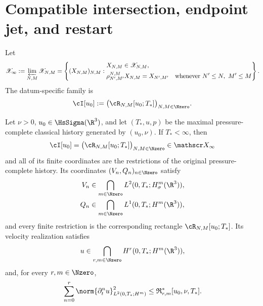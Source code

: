 \section{Compatible intersection, endpoint jet, and restart}

\begin{definition}
\label{def:compatible-intersection}
Let
\begin{equation}
 \mathscr X_\infty
 :=\varprojlim_{N,M}\mathscr X_{N,M}
 =\left\{(X_{N,M})_{N,M}:
 \begin{aligned}
 &X_{N,M}\in\mathscr X_{N,M},\\
 &\rho_{N',M'}^{N,M}X_{N,M}=X_{N',M'}
 \quad\text{whenever }N'\le N,\ M'\le M
 \end{aligned}
 \right\}.
 \label{eq:compatible-intersection-space}
\end{equation}
The datum-specific family is
\begin{equation}
 \cI[u_0]
 :=\bigl(\cR_{N,M}[u_0;T_*]\bigr)_{N,M\in\Nzero}.
 \label{eq:compatible-intersection}
\end{equation}
\end{definition}

\begin{theorem}
\label{thm:compatible-inverse-intersection}
Let \(\nu>0\), \(u_0\in\HsSigma(\R^3)\), and let
\((T_*,u,p)\) be the maximal pressure-complete classical history generated
by \((u_0,\nu)\).  If \(T_*<\infty\), then
\begin{equation}
 \cI[u_0]
 =\bigl(\cR_{N,M}[u_0;T_*]\bigr)_{N,M\in\Nzero}
 \in\mathscr X_\infty
 \label{eq:ier-compatible-family}
\end{equation}
and all of its finite coordinates are the restrictions of the original pressure-complete history.  Its coordinates \((V_n,Q_n)_{n\in\Nzero}\)
satisfy
\begin{align}
 V_n&\in\bigcap_{m\in\Nzero}L^2(0,T_*;H^m_\sigma(\R^3)),
 \label{eq:ier-inverse-velocity-coordinate}\\
 Q_n&\in\bigcap_{m\in\Nzero}L^1(0,T_*;H^m(\R^3)),
 \label{eq:ier-inverse-pressure-coordinate}
\end{align}
and every finite restriction is the corresponding rectangle
\(\cR_{N,M}[u_0;T_*]\).  Its velocity realization satisfies
\begin{equation}
 u\in\bigcap_{r,m\in\Nzero}H^r(0,T_*;H^m(\R^3)),
 \label{eq:mixed-sobolev-intersection}
\end{equation}
and, for every \(r,m\in\Nzero\),
\begin{equation}
 \sum_{n=0}^{r}\norm{\partial_t^nu}_{L^2(0,T_*;H^m)}^2
 \le\mathfrak R_{r,m}^*[u_0,\nu,T_*].
 \label{eq:mixed-sobolev-finite-bound}
\end{equation}
\end{theorem}

